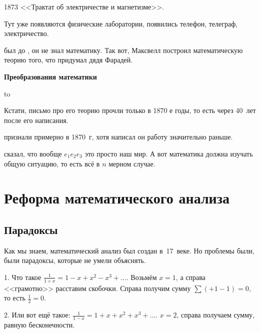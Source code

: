 \documentclass[a4paper,oneside,fleqn,10pt]{article}
\begin{document}
1873  <<Трактат об электричестве и магнетизме>>.

Тут уже появляются физические лаборатории, появились телефон, телеграф, электричество.

 был до , он не знал математику. Так вот, Максвелл построил математическую
теорию того, что придумал дядя Фарадей.

\textbf{Преобразования математики}

\halign to 

Кстати, письмо  про его теорию прочли только в 1870 е годы,
то есть через 40~лет  после его написания.

 признали примерно в 1870~г, хотя написал он работу значительно раньше.

 сказал, что вообще $e_1 e_2 e_3$ это просто наш мир. А вот
математика должна изучать общую ситуацию, то есть всё в $n$ мерном случае.

\section{Реформа математического анализа}

\subsection{Парадоксы}

Как мы знаем, математический анализ был создан в~17~веке. Но проблемы были, были парадоксы,
которые не умели объяснять.

1. Что такое $\frac{1}{1+x} = 1 -x + x^2 -x^3 +\dots$.
Возьмём $x = 1$, а справа <<грамотно>> расставим скобочки.
Справа получим сумму $\sum (+1 -1) = 0,$
то есть $\frac{1}{2} = 0$.

2. Или вот ещё такое:
$\frac{1}{1-x} = 1 + x + x^2 + x^3 + \dots$.
$x = 2$, справа получаем сумму, равную бесконечности.
\end{document}

